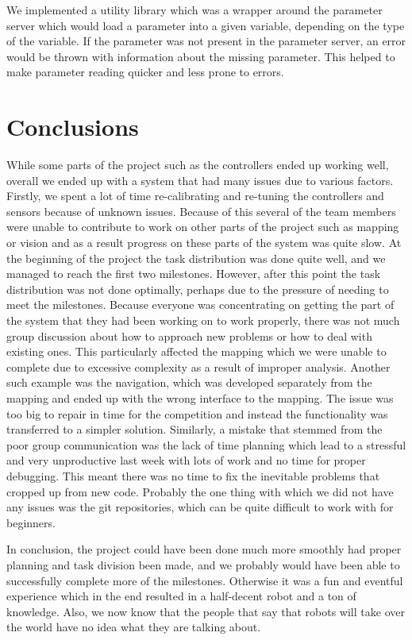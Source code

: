 \documentclass[10pt,a4paper,twocolumn]{article}
\begin{document}
We implemented a utility library which was a wrapper around the parameter server
which would load a parameter into a given variable, depending on the type of the
variable. If the parameter was not present in the parameter server, an error
would be thrown with information about the missing parameter. This helped to
make parameter reading quicker and less prone to errors.
\section{Conclusions}
While some parts of the project such as the controllers ended up working well,
overall we ended up with a system that had many issues due to various factors.
Firstly, we spent a lot of time re-calibrating and re-tuning the controllers and
sensors because of unknown issues. Because of this several of the team members
were unable to contribute to work on other parts of the project such as mapping
or vision and as a result progress on these parts of the system was quite slow.
At the beginning of the project the task distribution was done quite well, and
we managed to reach the first two milestones. However, after this point the task
distribution was not done optimally, perhaps due to the pressure of needing to
meet the milestones. Because everyone was concentrating on getting the part of
the system that they had been working on to work properly, there was not much
group discussion about how to approach new problems or how to deal with existing
ones. This particularly affected the mapping which we were unable to complete
due to excessive complexity as a result of improper analysis. Another such
example was the navigation, which was developed separately from the mapping and
ended up with the wrong interface to the mapping. The issue was too big to
repair in time for the competition and instead the functionality was transferred
to a simpler solution. Similarly, a mistake that stemmed from the poor group
communication was the lack of time planning which lead to a stressful and very
unproductive last week with lots of work and no time for proper debugging. This
meant there was no time to fix the inevitable problems that cropped up from new
code. Probably the one thing with which we did not have any issues was the git
repositories, which can be quite difficult to work with for beginners.

In conclusion, the project could have been done much more smoothly had proper
planning and task division been made, and we probably would have been able to
successfully complete more of the milestones. Otherwise it was a fun and eventful
experience which in the end resulted in a half-decent robot and a ton of
knowledge. Also, we now know that the people that say that robots will take over
the world have no idea what they are talking about. \nocite{*}
\printbibliography
\end{document}
